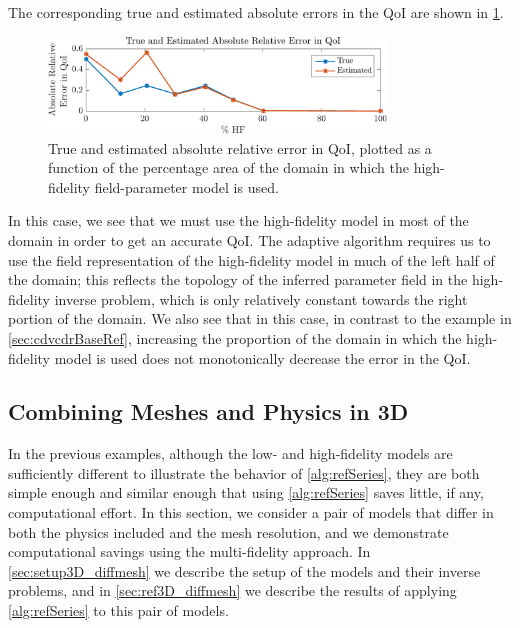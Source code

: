 \documentclass[review]{siamart0516}
\begin{document}
The corresponding true and estimated absolute errors in the QoI are shown in \cref{fig:svfErr}.
%
\begin{figure}[htbp]
\centering
\includegraphics[width=0.8\textwidth]{svf/err_est.pdf}
\caption{True and estimated absolute relative error in QoI, plotted as a function of the percentage area of the domain in which the high-fidelity field-parameter model is used.}
\label{fig:svfErr}
\end{figure}
%
In this case, we see that we must use the high-fidelity model in most of the domain in order to get an accurate QoI. The adaptive algorithm requires us to use the field representation of the high-fidelity model in much of the left half of the domain; this reflects the topology of the inferred parameter field in the high-fidelity inverse problem, which is only relatively constant towards the right portion of the domain. We also see that in this case, in contrast to the example in \cref{sec:cdvcdrBaseRef}, increasing the proportion of the domain in which the high-fidelity model is used does not monotonically decrease the error in the QoI.

\subsection{Combining Meshes and Physics in 3D} \label{sec:diffvcdr3D}

In the previous examples, although the low- and high-fidelity models are sufficiently different to illustrate the behavior of \cref{alg:refSeries}, they are both simple enough and similar enough that using \cref{alg:refSeries} saves little, if any, computational effort. In this section, we consider a pair of models that differ in both the physics included and the mesh resolution, and we demonstrate computational savings using the multi-fidelity approach. In \cref{sec:setup3D_diffmesh} we describe the setup of the models and their inverse problems, and in \cref{sec:ref3D_diffmesh} we describe the results of applying \cref{alg:refSeries} to this pair of models.
\end{document}

